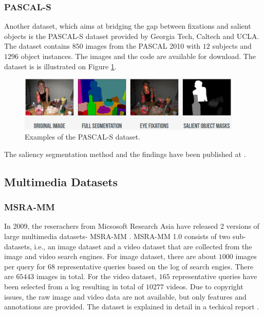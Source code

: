 \subsubsection{PASCAL-S}
Another dataset, which aims at bridging the gap between fixations and salient objects is the PASCAL-S dataset \cite{pascal-s_db} provided by Georgia Tech, Caltech and UCLA. The dataset contains $850$ images from the PASCAL 2010 with $12$ subjects and $1296$ object instances. The images and the code are available for download. The dataset is is illustrated on Figure \ref{fig:pascal-s}.

\begin{figure}[H]
\begin{center}
\includegraphics[width=0.95\textwidth]{fig/PASCAL-S}
\end{center}
\caption{Examples of the PASCAL-S dataset.}
\label{fig:pascal-s}
\end{figure}


The saliency segmentation method and the findings have been published at \cite{TPAMI.2012.147}.  

\subsection{Multimedia Datasets}
\subsubsection{MSRA-MM}
In 2009, the reserachers from Micsosoft Research Asia have released 2 versions of large multimedia datasets- MSRA-MM \cite{msra-mm_db}. MSRA-MM 1.0 consists of two sub-datasets, i.e., an image dataset and a video dataset that are collected from the image and video search engines. For image dataset, there are about $1000$ images per query for $68$ representative queries based on the log of search engies. There are $65443$ images in total. For the video dataset, $165$ representative queries have been selected from a log resulting in total of $10277$ videos. Due to copyright issues, the raw image and video data are not available, but only features and annotations are provided. The dataset is explained in detail in a techical report \cite{export:79942}.

